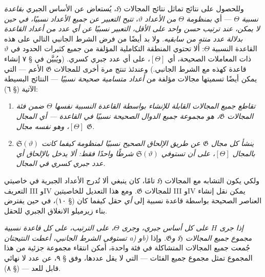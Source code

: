 \documentclass[11pt]{article}
\begin{document}
وللحصول على نتائج تماثل نتائج المجالات $\mathfrak H$، يُستعاض عن الأساس
الجبري \emph{بقاعدة نسبية} $\Theta$ --- أي \emph{بمنظومة} $\Theta$
\emph{من الأعداد} $\vartheta$، \emph{تتيح التعبير عن جميع الأعداد نسبيًا،
في حين لا يمكن، عند ترتيب حسن واحد على الأقل، التعبير نسبيًا عن أي عدد من
أعداد القاعدة بدلالة عدد منتهٍ من سابقيه}. ولا بد أيضًا من فرض الشرط الجانبي
التالي على هذه القاعدة النسبية $\Theta$: ألا تحتوي المنطقة التكاملية
المؤلفة من جميع كثيرات الحدود في $\vartheta$ ذات المعاملات الصحيحة، أي
$[\Theta]$، على أي عدد جبري كسري. (ويُبيَّن في § ٧ إنشاء قاعدة كهذه مع الشرط
الجانبي.) وعندئذ تنتج مرة أخرى للمجالات $\mathfrak G$ الأعم --- التي يمكن
أيضًا تسميتها مجالات مؤلفة من \emph{أعداد متسامية صحيحة نسبيًا} --- النتائج
البسيطة الآتية (§ ٦):
\begin{enumerate}
\item[a)] \emph{تقاطع جميع المجالات القابلة للإنشاء بواسطة القاعدة النسبية
نفسها $\Theta$ ضمن فئة المجالات $\mathfrak G$، هو مجموعة جميع الدوال الصحيحة نسبيًا في
القاعدة --- أي المجال $[\Theta]$، وهو نفسه مجال $\mathfrak G$.}
\item[b)] \emph{ينشأ كل مجال $\mathfrak G$ عن طريق الإلحاق الصحيح نسبيًا
لمنظومة كيفما كانت $\mathfrak S(\vartheta)$ بالمجال $[\Theta]$، على أن
تستوفي $\mathfrak S(\vartheta)$ شرطًا واحدًا فقط: ألا يدخل بالإلحاق أي عدد
جبري كسري في المجال.}
\end{enumerate}

ولكي يكون التشابه مع المجالات $\mathfrak H$ تامًا، كان ينبغي ألا تُدرج
الأعداد الجبرية في خاصيتي التعريف III وIV للمجالات $\mathfrak G$. ومع هذا
التعديل للخاصيتين III وIV يمكن نقل إنشاء العناصر الصحيحة بواسطة قاعدة نسبية
إلى \emph{أي} حقل كيفما كان (§ ١٠)، في حين يفترض بناء زيرميلو الانغلاق الجبري
للحقل.

\emph{إذا جرى $H$ على كل أساس جبري، وجرى $\Theta$، على الترتيب، على كل
قاعدة نسبية تستوفي الشرط الجانبي، أعطت النتيجتان a) وb) مجموع جميع المجالات
$\mathfrak H$ و$\mathfrak G$.} وإذا جُمعت جميع المجالات المتشاكلة في فئة
واحدة، أمكن انتقاء مجموعة جزئية من هذا المجموع تمثل مجموع جميع الفئات ---
التي لا يقل عددها، وفق § ٩، عن عدد لا نهائي قابل للعد --- (§ ٨).
\end{document}
